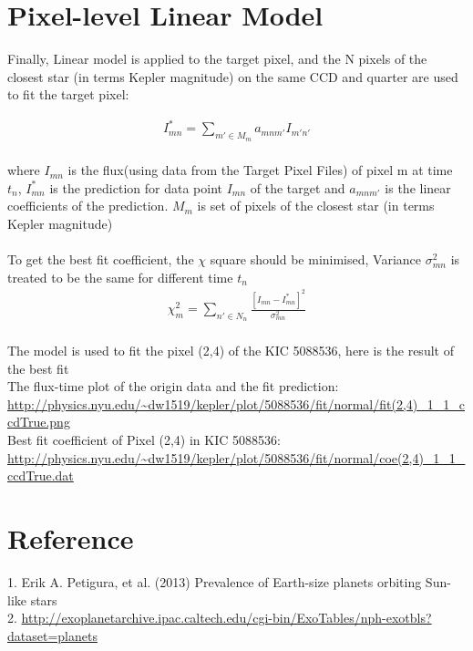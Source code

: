 \documentclass[]{article}
\begin{document}
\section{Pixel-level Linear Model}
Finally, Linear model is applied to the target pixel, and the N pixels of the closest star  (in terms Kepler magnitude) on the same CCD and quarter are used to fit the target pixel:

\begin{align*}
I_{mn}^{*}=\sum_{m' \in M_{m}} a_{mnm'}I_{m'n'}
\end{align*}
\\
where $I_{mn}$ is the flux(using data from the Target Pixel Files) of pixel m at time $t_{n}$, $I_{mn}^{*}$ is the prediction for data point $I_{mn}$ of the target and $a_{mnm'}$  is the linear coefficients of the prediction. $M_{m}$ is set of pixels of the closest star (in terms Kepler magnitude)
\\
\\
To get the best fit coefficient, the $\chi$ square should be minimised, Variance $\sigma _{mn}^{2}$ is treated to be the same for different time $t_{n}$
\begin{align*}
\chi_{m}^{2}=\sum_{n' \in N_{n}} \frac{[I_{mn}-I_{mn}^{*}]^{2}}{\sigma _{mn}^{2}}
\end{align*}
\\
The model is used to fit the pixel (2,4) of the KIC 5088536, here is the result of the best fit\\
The flux-time plot of the origin data and the fit prediction:\\
\url{http://physics.nyu.edu/~dw1519/kepler/plot/5088536/fit/normal/fit(2,4)_1_1_ccdTrue.png}\\
Best fit coefficient of Pixel (2,4) in KIC 5088536:\\
\url{http://physics.nyu.edu/~dw1519/kepler/plot/5088536/fit/normal/coe(2,4)_1_1_ccdTrue.dat}\\

\section{Reference}
1. Erik A. Petigura, et al. (2013) Prevalence of Earth-size planets orbiting Sun-like stars\\
2. \url{http://exoplanetarchive.ipac.caltech.edu/cgi-bin/ExoTables/nph-exotbls?dataset=planets}
\end{document}
